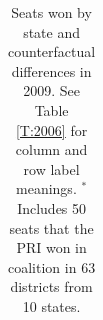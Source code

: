 \documentclass[letter,12pt]{article}
\begin{document}
\begin{table}
\begin{center}
\begin{tabular}{rrrr|rrr|rrr|rrr}
\end{tabular}
\caption{Seats won by state and counterfactual differences in 2009. See Table \ref{T:2006} for column and row label meanings. $^*$Includes 50 seats that the PRI won in coalition in 63 districts from 10 states.}\label{T:2009}
\end{center}
\end{table}
\end{document}
